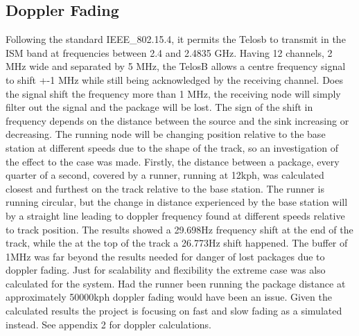 \subsection{Doppler Fading}
Following the standard IEEE\_802.15.4, it permits the Telosb to transmit in the ISM  band at frequencies between 2.4 and 2.4835 GHz. Having 12 channels, 2 MHz wide and separated by 5 MHz, the TelosB allows a centre frequency signal to shift +-1 MHz while still being acknowledged by the receiving channel. Does the signal shift the frequency more than 1 MHz, the receiving node will simply filter out the signal and the package will be lost. The sign of the shift in frequency depends on the distance between the source and the sink increasing or decreasing. The running node will be changing position relative to the base station at different speeds due to the shape of the track, so an investigation of the effect to the case was made. Firstly, the distance between a package, every quarter of a second, covered by a runner, running at 12kph, was calculated closest and furthest on the track relative to the base station. The runner is running circular, but the change in distance experienced by the base station will by a straight line leading to doppler frequency found at different speeds relative to track position. The results showed a 29.698Hz frequency shift at the end of the track, while the at the top of the track a 26.773Hz shift happened. The buffer of 1MHz was far beyond the results needed for danger of lost packages due to doppler fading. Just for scalability and flexibility the extreme case was also calculated for the system. Had the runner been running the package distance at approximately 50000kph doppler fading would have been an issue. Given the calculated results the project is focusing on fast and slow fading as a simulated instead. See appendix 2 for doppler calculations.

